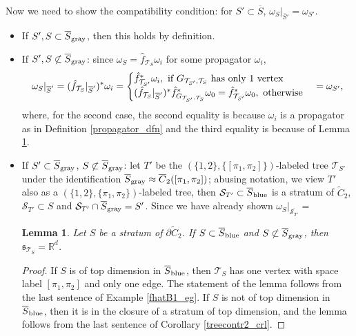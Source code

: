 \documentclass[11pt]{article}
\newtheorem{lmm}[thm]{Lemma}
\theoremstyle{definition}
\theoremstyle{remark}
\def\wt#1{\widetilde{#1}}
\def\ov#1{\overline{#1}}
\def\sgray{{\textnormal{gray}}}
\def\sblue{{\textnormal{blue}}}
\def\R{\mathbb{R}}
\def\fs{\mathfrak{s}}
\def\cT{\mathcal{T}}
\def\cS{\mathcal{S}}
\def\tn#1{\textnormal{#1}}
\begin{document}
Now we need to show the compatibility condition:
for $S'\subset\ov{S}$, $\omega_S|_{\ov{S}'}=\omega_{S'}$. 
\begin{itemize}
\item If $S',S\subset\ov{S}_{\sgray}$, then this holds by definition. 

\item 
If $S',S\not\subset\ov{S}_{\sgray}$: since $\omega_S=\hat{f}_{\cT_S}\omega_i$ for some propagator $\omega_i$, 
$$\omega_S|_{\ov{S}'}=(\hat{f}_{\cT_S}|_{\ov{S}'})^*\omega_i=
\begin{cases}
\hat{f}_{\cT_{S'}}^*\omega_{i}, 
\tn{ if } G_{\cT_{S'},\cT_S} \tn{ has only 1 vertex}
\\
(\hat{f}_{\cT_S}|_{\ov{S}'})^*\hat{f}_{G_{\cT_{S'},\cT_S}}^*\omega_0=\hat{f}_{\cT_{S'}}^*\omega_{0}, \tn{ otherwise}
\end{cases}
=\omega_{S'},$$
where, for the second case, the second equality is because $\omega_i$ is a propagator as in Definition \ref{propagator_dfn} and the third equality is because of Lemma \ref{treecontr4_lmm}. 

\item If $S'\subset\ov{S}_{\sgray}$, $S\not\subset\ov{S}_{\sgray}$: 
let $T'$ be the $(\{1,2\},\{[\pi_1,\pi_2]\})$-labeled tree $\cT_{S'}$ under the identification $\ov{S}_{\sgray}\approx\ov{C}_2([\pi_1,\pi_2])$; 
abusing notation, we view $T'$ also as a $(\{1,2\},\{\pi_1,\pi_2\})$-labeled tree, 
then $\cS_{T'}\subset\ov{S}_{\sblue}$ is a stratum of $\wt{C}_2$, 
$\cS_{T'}\subset S$ and $\cS_{T'}\cap\ov{S}_{\sgray}=S'$. 
Since we have already shown $\omega_S|_{\ov{\cS_{T'}}}=$

 
\begin{lmm}\label{treecontr4_lmm}
Let $S$ be a stratum of $\partial\wt{C}_2$. 
If $S\subset\ov{S}_{\sblue}$ and $S\not\subset\ov{S}_{\sgray}$, then $\fs_{\cT_S}=\R^d$. 
\end{lmm}
\begin{proof}
If $S$ is of top dimension in $\ov{S}_{\sblue}$, then $\cT_S$ has one vertex with space label $[\pi_1,\pi_2]$ and only one edge. 
The statement of the lemma follows from the last sentence of Example \ref{fhatB1_eg}. 
If $S$ is not of top dimension in $\ov{S}_{\sblue}$, then it is in the closure of a stratum of top dimension, and the lemma follows from the last sentence of Corollary \ref{treecontr2_crl}. 
\end{proof}
\end{itemize}
\end{document}

